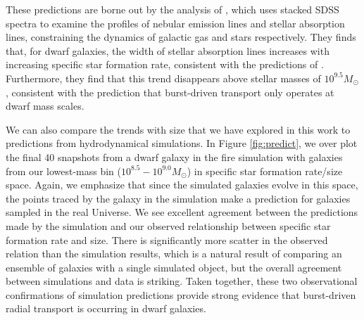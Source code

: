 \documentclass[iop]{emulateapj}
\begin{document}
These predictions are borne out by the analysis of \cite{Cicone16}, which uses stacked SDSS spectra to examine the profiles of nebular emission lines and stellar absorption lines, constraining the dynamics of galactic gas and stars respectively. They finds that, for dwarf galaxies, the width of stellar absorption lines increases with increasing specific star formation rate, consistent with the predictions of \cite{El-Badry17}. Furthermore, they find that this trend disappears above stellar masses of $10^{9.5} M_{\odot}$, consistent with the prediction that burst-driven transport only operates at dwarf mass scales.

We can also compare the trends with size that we have explored in this work to predictions from hydrodynamical simulations. In Figure \ref{fig:predict}, we over plot the final 40 snapshots from a dwarf galaxy in the fire simulation with galaxies from our lowest-mass bin ($10^{8.5}-10^{9.0} M_{\odot}$) in specific star formation rate/size space. Again, we emphasize that since the simulated galaxies evolve in this space, the points traced by the galaxy in the simulation make a prediction for galaxies sampled in the real Universe. We see excellent agreement between the predictions made by the simulation and our observed relationship between specific star formation rate and size. There is significantly more scatter in the observed relation than the simulation results, which is a natural result of comparing an ensemble of galaxies with a single simulated object, but the overall agreement between simulations and data is striking. Taken together, these two observational confirmations of simulation predictions provide strong evidence that burst-driven radial transport is occurring in dwarf galaxies.
\end{document}
